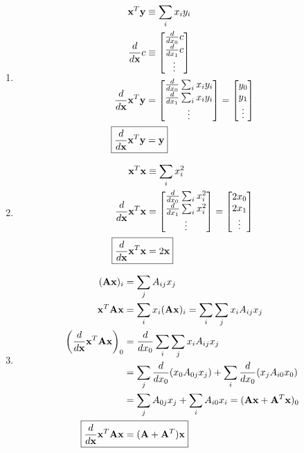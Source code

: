 \documentclass[submit]{harvardml}
\begin{document}
\begin{enumerate}[label=(\alph*)]
\item
  \begin{align*}
    \boldx^T \boldy &\equiv \sum_i x_i y_i\\
    \frac{d}{d\boldx} c &\equiv
    \begin{bmatrix}
      \frac{d}{dx_0} c\\
      \frac{d}{dx_1} c\\
      \vdots
    \end{bmatrix}\\
    \frac{d}{d\boldx} \boldx^T\boldy &=
    \begin{bmatrix}\frac{d}{dx_0}  \sum_i x_i y_i \\ \frac{d}{dx_1}
      \sum_i x_i y_i \\ \vdots\end{bmatrix} = \begin{bmatrix}y_0\\y_1\\\vdots\end{bmatrix}\\
    \Aboxed{\frac{d}{d\boldx} \boldx^T\boldy &=\boldy}
  \end{align*}
\item
  \begin{align*}
    \boldx^T \boldx &\equiv \sum_i x_i^2\\
    \frac{d}{d\boldx} \boldx^T\boldx &=
    \begin{bmatrix}\frac{d}{dx_0}  \sum_i x_i^2 \\ \frac{d}{dx_1}
      \sum_i x_i^2 \\ \vdots\end{bmatrix} = \begin{bmatrix}2x_0\\2x_1\\\vdots\end{bmatrix}\\
        \Aboxed{\frac{d}{d\boldx} \boldx^T\boldx &= 2\boldx}
  \end{align*}
\item
  \begin{align*}
    (\boldA\boldx)_i &= \sum_jA_{ij} x_j\\
    \boldx^T\boldA\boldx &= \sum_i x_i(\boldA\boldx)_i =
    \sum_i\sum_j x_iA_{ij}x_j\\
    \left(\frac{d}{d\boldx}\boldx^T\boldA\boldx\right)_0 &=
    \frac{d}{dx_0}\sum_i\sum_j x_iA_{ij}x_j\\
    &= \sum_j \frac{d}{dx_0} (x_0A_{0j}x_j) + \sum_i
    \frac{d}{dx_0}(x_jA_{i0}x_0)\\
    &= \sum_j A_{0j}x_j + \sum_i A_{i0}x_i = (\boldA\boldx +
    \boldA^T\boldx)_0\\
    \Aboxed{\frac{d}{d\boldx} \boldx^T\boldA\boldx &= (\boldA+\boldA^T)\boldx}
  \end{align*}
\end{enumerate}
\end{document}
